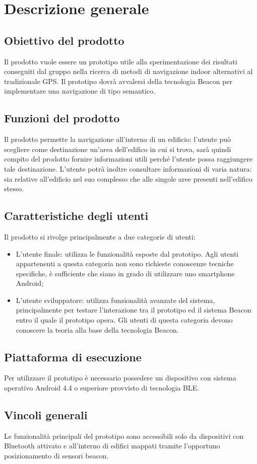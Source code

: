 \documentclass[../AnalisiDeiRequisiti.tex]{subfiles}
\begin{document}
\section{Descrizione generale}
	\subsection{Obiettivo del prodotto}
	Il prodotto vuole essere un prototipo utile alla sperimentazione dei risultati conseguiti dal gruppo nella ricerca di metodi di navigazione indoor alternativi al tradizionale GPS.
Il prototipo dovrà avvalersi della tecnologia Beacon per implementare una navigazione di tipo semantico.

	\subsection{Funzioni del prodotto}
	Il prodotto permette la navigazione all'interno di un edificio: l'utente può scegliere come destinazione un'area dell'edifico in cui si trova, sarà quindi compito del prodotto fornire informazioni utili perché l'utente possa raggiungere tale destinazione.
L'utente potrà inoltre consultare informazioni di varia natura: sia relative all'edificio nel suo complesso che alle singole aree presenti nell'edifico stesso.
		
	\subsection{Caratteristiche degli utenti} 
	Il prodotto si rivolge principalmente a due categorie di utenti:
	\begin{itemize}
		\item L'utente finale: utilizza le funzionalità esposte dal prototipo. Agli utenti appartenenti a questa categoria non sono richieste conoscenze tecniche specifiche, è sufficiente che siano in grado di utilizzare uno smartphone Android;
		\item L'utente sviluppatore: utilizza funzionalità avanzate del sistema, principalmente per testare l'interazione tra il prototipo ed il sistema Beacon entro il quale il prototipo opera. Gli utenti di questa categoria devono conoscere la teoria alla base della tecnologia Beacon.
	\end{itemize}
	
	\subsection{Piattaforma di esecuzione}
	Per utilizzare il prototipo è necessario possedere un dispositivo con sistema operativo Android 4.4 o superiore provvisto di tecnologia BLE.
	
	\subsection{Vincoli generali}
	Le funzionalità principali del prototipo sono accessibili solo da dispositivi con Bluetooth attivato e all'interno di edifici mappati tramite l'opportuno posizionamento di sensori beacon.
\end{document}
